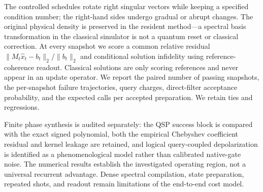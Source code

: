 The controlled schedules rotate right singular vectors while keeping a
specified condition number; the right-hand sides undergo gradual or
abrupt changes. The original physical density is preserved in the
resident method---a spectral basis transformation in the classical
simulator is not a quantum reset or classical correction. At every
snapshot we score a common relative residual
$\|M_t\widehat{x}_t-b_t\|_2/\|b_t\|_2$ and conditional solution infidelity
using reference-coherence readout. Classical solutions are only scoring
references and never appear in an update operator. We report the paired
number of passing snapshots, the per-snapshot failure trajectories,
query charges, direct-filter acceptance probability, and the expected
calls per accepted preparation. We retain ties and regressions.

Finite phase synthesis is audited separately: the QSP success block
is compared with the exact signed polynomial, both the empirical
Chebyshev coefficient residual and kernel leakage are retained, and
logical query-coupled depolarization is identified as a phenomenological
model rather than calibrated native-gate noise. The numerical results
establish the investigated operating region, not a universal recurrent
advantage. Dense spectral compilation, state preparation, repeated
shots, and readout remain limitations of the end-to-end cost model.

